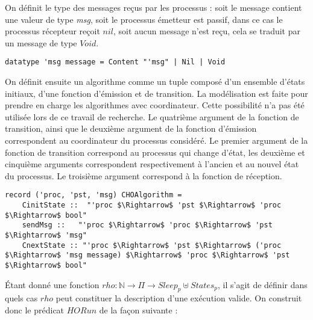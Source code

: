 \documentclass{article}
\begin{document}
On définit le type des messages reçus par les processus : soit le message contient une valeur de type \textit{msg}, soit le processus émetteur est passif,
dans ce cas le processus récepteur reçoit $nil$, soit aucun message n'est reçu, cela se traduit par un message de type $Void$.

\begin{lstlisting}
datatype 'msg message = Content "'msg" | Nil | Void
\end{lstlisting}

On définit ensuite un algorithme comme un tuple composé d'un ensemble d'états initiaux, d'une fonction d'émission et de transition.
La modélisation est faite pour prendre en charge les algorithmes avec coordinateur. Cette possibilité n'a pas été utilisée lors de ce travail de recherche.
Le quatrième argument de la fonction de transition, ainsi que le deuxième argument de la fonction d'émission correspondent au coordinateur du processus considéré.
Le premier argument de la fonction de transition correspond au processus qui change d'état, les deuxième et cinquième arguments correspondent respectivement à l'ancien et au nouvel état du processus.
Le troisième argument correspond à la fonction de réception.

\begin{lstlisting}[mathescape=true]
record ('proc, 'pst, 'msg) CHOAlgorithm =
	CinitState ::  "'proc $\Rightarrow$ 'pst $\Rightarrow$ 'proc $\Rightarrow$ bool"
	sendMsg ::   "'proc $\Rightarrow$ 'proc $\Rightarrow$ 'pst $\Rightarrow$ 'msg"
	CnextState :: "'proc $\Rightarrow$ 'pst $\Rightarrow$ ('proc $\Rightarrow$ 'msg message) $\Rightarrow$ 'proc $\Rightarrow$ 'pst $\Rightarrow$ bool"
\end{lstlisting}

Étant donné une fonction $rho : \mathds{N} \rightarrow \Pi \rightarrow Sleep_p \uplus States_p$, il s'agit de définir dans quels cas $rho$ peut constituer la description d'une exécution valide.
On construit donc le prédicat $HORun$ de la façon suivante :
\end{document}
